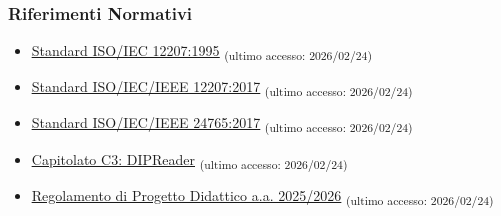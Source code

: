 \documentclass[a4paper,12pt]{article}
\newcommand{\ped}[1]{\textsubscript{#1}}
\begin{document}
\subsubsection{Riferimenti Normativi}
\begin{itemize}
    \item \href{https://www.math.unipd.it/~tullio/IS-1/2009/Approfondimenti/ISO_12207-1995.pdf}{\ul{Standard ISO/IEC 12207:1995}} \ped{(ultimo accesso: 2026/02/24)}
    \item \href{https://www.iso.org/standard/63712.html}{\ul{Standard ISO/IEC/IEEE 12207:2017}} \ped{(ultimo accesso: 2026/02/24)}
    \item \href{https://www.iso.org/standard/71952.html}{\ul{Standard ISO/IEC/IEEE 24765:2017}} \ped{(ultimo accesso: 2026/02/24)}
    \item \href{https://www.math.unipd.it/~tullio/IS-1/2025/Progetto/C3.pdf}{\ul{Capitolato C3: DIPReader}} \ped{(ultimo accesso: 2026/02/24)}
    \item \href{https://www.math.unipd.it/~tullio/IS-1/2025/Dispense/PD1.pdf}{\ul{Regolamento di Progetto Didattico a.a.
                  2025/2026}} \ped{(ultimo accesso: 2026/02/24)}
\end{itemize}
\end{document}
